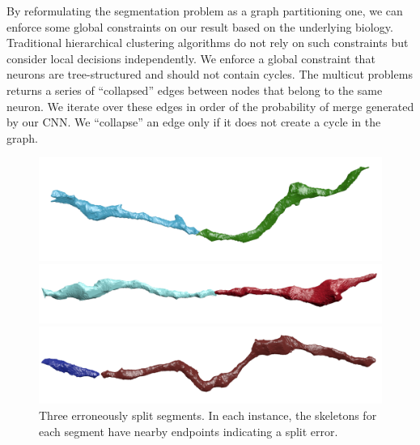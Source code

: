 By reformulating the segmentation problem as a graph partitioning one, we can enforce some global constraints on our result based on the underlying biology.
Traditional hierarchical clustering algorithms do not rely on such constraints but consider local decisions independently.
We enforce a global constraint that neurons are tree-structured and should not contain cycles. 
The multicut problems returns a series of ``collapsed'' edges between nodes that belong to the same neuron.
We iterate over these edges in order of the probability of merge generated by our CNN. 
We ``collapse'' an edge only if it does not create a cycle in the graph.

\begin{figure}[t]
	\centering
	\begin{minipage}{0.32\linewidth}
		\includegraphics[width=\linewidth]{./figures/split_error1.png}		
	\end{minipage}
	\hfill
	\begin{minipage}{0.32\linewidth}
		\includegraphics[width=\linewidth]{./figures/split_error2.png}				
	\end{minipage}
	\hfill
	\begin{minipage}{0.32\linewidth}
		\includegraphics[width=\linewidth]{./figures/split_error3.png}
	\end{minipage}
	\caption{Three erroneously split segments. In each instance, the skeletons for each segment have nearby endpoints indicating a split error.}
	\label{fig:merge_candidates}
\end{figure}



